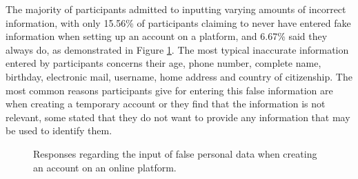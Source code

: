 
The majority of participants admitted to inputting varying amounts of
incorrect information, with only 15.56\% of participants claiming to never
have entered fake information when setting up an account on a platform,
and 6.67\% said they always do, as demonstrated in Figure \ref{fig:creating_account_false_data}.
The most typical inaccurate information
entered by participants concerns their age, phone number, complete name,
birthday, electronic mail, username, home address and country of citizenship.
The most common reasons participants give for entering this false
information are when creating a temporary account or they
find that the information is not relevant, some stated that they do
not want to provide any information that may be used to identify them.

\begin{figure}[H]
    \begin{center}
        \caption{Responses regarding the input of false personal data when creating an account on an online platform.}
        \label{fig:creating_account_false_data}
    \end{center}
\end{figure}

